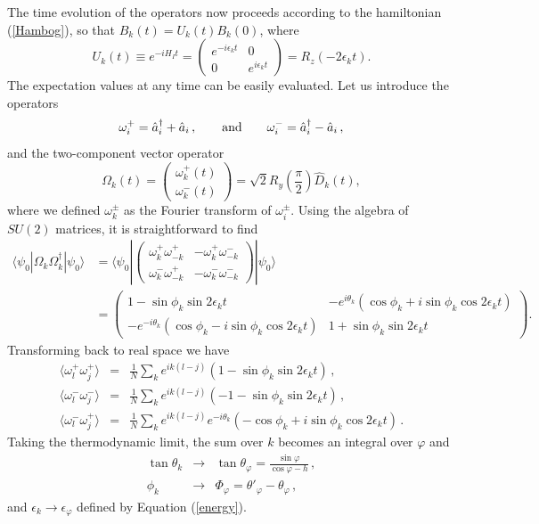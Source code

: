 \documentclass[12pt,preprint,tighten,eqsecnum,aps,floats,psfig,epsfig,amsmath,onecolumn]{revtex4-1}
\def\be{\begin{equation}}
\def\ee{\end{equation}}
\def\bea{\begin{eqnarray}}
\def\eea{\end{eqnarray}}
\def\e{\epsilon}
\def\o{\omega}
\def\p{\varphi}
\def\Fa{\hat{a}}
\def\FD{\hat{D}}
\begin{document}
The time evolution of the operators now proceeds according to the hamiltonian
(\ref{Hambog}), so that $B_k(t) = U_k(t) B_k(0)$, where 
\be 
U_k(t) \equiv e^{-i H_I t}=
\begin{pmatrix}
e^{-i \e_k t} & 0\\
0 & e^{i \e_k t}
\end{pmatrix}
= R_z(-2\e_k t). 
\ee 
The expectation values at any time can be easily evaluated.
Let us introduce the operators 
\be 
\o^+_i=\Fa^\dag_i+\Fa_i\,,\qquad {\rm and} \qquad 
\o^-_i=\Fa^\dag_i-\Fa_i\,,
\ee
and the two-component vector operator
\be 
\Omega_k(t) = \begin{pmatrix}
\o^+_k(t)\\\o^-_k(t)
\end{pmatrix}
= \sqrt{2} R_{y}\left(\frac{\pi}{2}\right) \FD_k(t), 
\ee 
where we defined $\o^{\pm}_k$ as the Fourier transform of 
$\o^{\pm}_i$. 
Using the algebra of $SU(2)$ matrices, it is straightforward to 
find \cite{sps-04}
\begin{align}
\langle\psi_0 | \Omega_k \Omega_k^\dag|\psi_0\rangle &=
\langle\psi_0 |
\begin{pmatrix}
\o^+_k \o^+_{-k} & -\o^+_k \o^-_{-k} \\
\o^-_k \o^+_{-k} & -\o^-_k \o^-_{-k}
\end{pmatrix}
|\psi_0\rangle \nonumber \\
&= \begin{pmatrix}
1 - \sin\phi_k\sin 2\e_k t & -e^{i \theta_k} (\cos \phi_k + i \sin\phi_k\cos 2\e_k t)\\
-e^{-i \theta_k} (\cos \phi_k - i \sin\phi_k \cos 2\e_k t) &
1 + \sin\phi_k\sin 2\e_k t
\end{pmatrix}.
\end{align}
Transforming back to real space we have 
\bea
\langle \o^+_l\o^+_j\rangle &=& 
\frac{1}{N}\sum_k e^{ik(l-j)}(1-\sin\phi_k\sin 2\e_k t)\,,\nonumber\\
\langle \o^-_l\o^-_j\rangle &=& 
\frac{1}{N}\sum_k e^{ik(l-j)}(-1-\sin\phi_k\sin 2\e_k t)\,,\nonumber\\
\langle \o^-_l\o^+_j\rangle &=& 
\frac{1}{N}\sum_k e^{ik(l-j)}e^{-i\theta_k}(-\cos\phi_k+ i\sin\phi_k\cos 2\e_k t)\,. 
\label{timeev}
\eea
Taking the thermodynamic limit, the sum over $k$ becomes 
an integral over $\p$ and
\bea
\tan\theta_k&\rightarrow& \tan\theta_\p= \frac{\sin\p}{\cos\p-h}\,,\nonumber\\
\phi_k&\rightarrow& \Phi_\p= \theta'_\p-\theta_\p\,, 
\eea
and $\e_k\rightarrow\e_\p$ defined by Equation (\ref{energy}).
\end{document}
